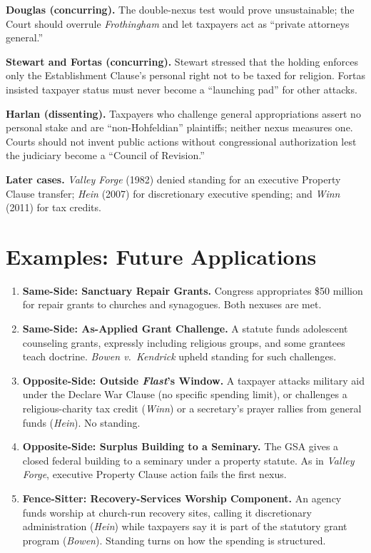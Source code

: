 \documentclass[12pt]{article}
\begin{document}
\textbf{Douglas (concurring).} The double-nexus test would prove unsustainable; the Court should overrule \textit{Frothingham} and let taxpayers act as ``private attorneys general.''

\textbf{Stewart and Fortas (concurring).} Stewart stressed that the holding enforces only the Establishment Clause's personal right not to be taxed for religion. Fortas insisted taxpayer status must never become a ``launching pad'' for other attacks.

\textbf{Harlan (dissenting).} Taxpayers who challenge general appropriations assert no personal stake and are ``non-Hohfeldian'' plaintiffs; neither nexus measures one. Courts should not invent public actions without congressional authorization lest the judiciary become a ``Council of Revision.''

\textbf{Later cases.} \textit{Valley Forge} (1982) denied standing for an executive Property Clause transfer; \textit{Hein} (2007) for discretionary executive spending; and \textit{Winn} (2011) for tax credits.

\section{Examples: Future Applications}

\begin{enumerate}
\item \textbf{Same-Side: Sanctuary Repair Grants.} Congress appropriates \$50 million for repair grants to churches and synagogues. Both nexuses are met.
\item \textbf{Same-Side: As-Applied Grant Challenge.} A statute funds adolescent counseling grants, expressly including religious groups, and some grantees teach doctrine. \textit{Bowen v.\ Kendrick} upheld standing for such challenges.
\item \textbf{Opposite-Side: Outside \textit{Flast}'s Window.} A taxpayer attacks military aid under the Declare War Clause (no specific spending limit), or challenges a religious-charity tax credit (\textit{Winn}) or a secretary's prayer rallies from general funds (\textit{Hein}). No standing.
\item \textbf{Opposite-Side: Surplus Building to a Seminary.} The GSA gives a closed federal building to a seminary under a property statute. As in \textit{Valley Forge}, executive Property Clause action fails the first nexus.
\item \textbf{Fence-Sitter: Recovery-Services Worship Component.} An agency funds worship at church-run recovery sites, calling it discretionary administration (\textit{Hein}) while taxpayers say it is part of the statutory grant program (\textit{Bowen}). Standing turns on how the spending is structured.
\end{enumerate}
\end{document}

